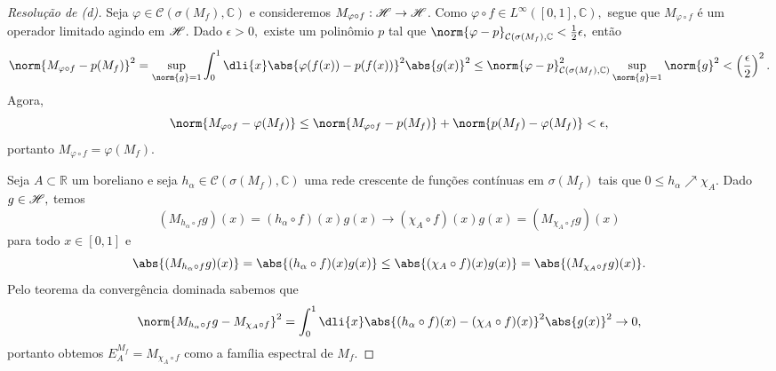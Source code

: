 \begin{proof}[Resolução de (d)]
  Seja \(\varphi \in \mathcal{C}(\sigma(M_f), \mathbb{C})\) e consideremos \(M_{\varphi \circ f}: \mathscr{H} \to \mathscr{H}\). Como \(\varphi\circ f \in L^\infty([0,1],\mathbb{C}),\) segue que \(M_{\varphi \circ f}\) é um operador limitado agindo em \(\mathscr{H}\). Dado \(\epsilon > 0,\) existe um polinômio \(p\) tal que \(\norm{\varphi - p}_{\mathcal{C}(\sigma(M_f), \mathbb{C}} < \frac12 \epsilon,\) então
  \begin{equation*}
    \norm{M_{\varphi \circ f} - p(M_f)}^2 = \sup_{\norm{g} = 1} \int_0^1 \dli{x} \abs{\varphi(f(x)) - p(f(x))}^2 \abs{g(x)}^2 \leq \norm{\varphi - p}^2_{\mathcal{C}(\sigma(M_f), \mathbb{C})} \sup_{\norm{g} = 1} \norm{g}^2 < \left(\frac\epsilon2\right)^2.
  \end{equation*}
  Agora,
  \begin{equation*}
    \norm{M_{\varphi\circ f} - \varphi(M_f)} \leq \norm{M_{\varphi \circ f} - p(M_f)} + \norm{p(M_f) - \varphi(M_f)} < \epsilon,
  \end{equation*}
  portanto \(M_{\varphi \circ f} = \varphi(M_f).\)

  Seja \(A \subset \mathbb{R}\) um boreliano e seja \(h_\alpha \in \mathcal{C}(\sigma(M_f), \mathbb{C})\) uma rede crescente de funções contínuas em \(\sigma(M_f)\) tais que \(0 \leq h_\alpha \nearrow \chi_A.\) Dado \(g \in \mathscr{H},\) temos
  \begin{equation*}
    (M_{h_\alpha\circ f}g)(x) = (h_\alpha\circ f)(x) g(x) \to (\chi_A\circ f)(x) g(x) = (M_{\chi_A \circ f}g)(x)
  \end{equation*}
  para todo \(x \in [0,1]\) e
  \begin{equation*}
    \abs{(M_{h_\alpha\circ f}g)(x)} = \abs{(h_\alpha\circ f)(x) g(x)} \leq \abs{(\chi_A\circ f)(x) g(x)} = \abs{(M_{\chi_A \circ f}g)(x)}.
  \end{equation*}
  Pelo teorema da convergência dominada sabemos que
  \begin{equation*}
    \norm{M_{h_\alpha \circ f}g - M_{\chi_A \circ f}}^2 = \int_0^1 \dli{x} \abs{(h_\alpha\circ f)(x) - (\chi_A\circ f)(x)}^2 \abs{g(x)}^2 \to 0,
  \end{equation*}
  portanto obtemos \(E_A^{M_f} = M_{\chi_A \circ f}\) como a família espectral de \(M_f.\)
\end{proof}
